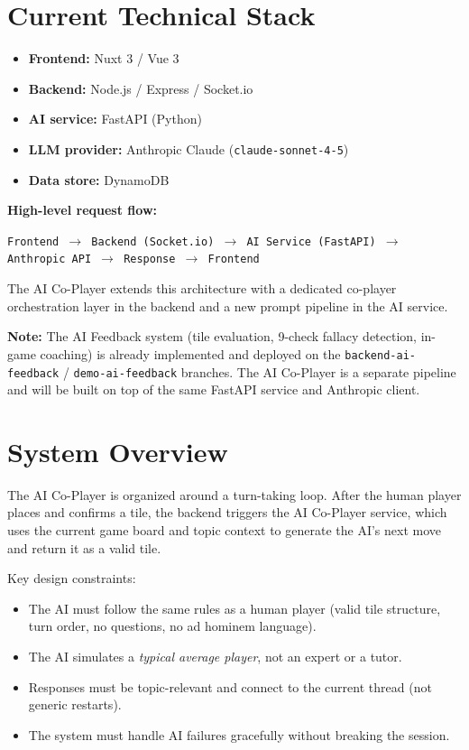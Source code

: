 \documentclass[11pt]{article}
\begin{document}
\section{Current Technical Stack}

\begin{itemize}
  \item \textbf{Frontend:} Nuxt 3 / Vue 3
  \item \textbf{Backend:} Node.js / Express / Socket.io
  \item \textbf{AI service:} FastAPI (Python)
  \item \textbf{LLM provider:} Anthropic Claude (\texttt{claude-sonnet-4-5})
  \item \textbf{Data store:} DynamoDB
\end{itemize}

\textbf{High-level request flow:}

\begin{center}
  \texttt{Frontend \(\rightarrow\) Backend (Socket.io) \(\rightarrow\) AI Service (FastAPI) \(\rightarrow\) Anthropic API \(\rightarrow\) Response \(\rightarrow\) Frontend}
\end{center}

The AI Co-Player extends this architecture with a dedicated co-player orchestration layer in the
backend and a new prompt pipeline in the AI service.

\textbf{Note:} The AI Feedback system (tile evaluation, 9-check fallacy detection, in-game
coaching) is already implemented and deployed on the \texttt{backend-ai-feedback} /
\texttt{demo-ai-feedback} branches. The AI Co-Player is a separate pipeline and will be built
on top of the same FastAPI service and Anthropic client.

\section{System Overview}

The AI Co-Player is organized around a turn-taking loop. After the human player places and
confirms a tile, the backend triggers the AI Co-Player service, which uses the current game
board and topic context to generate the AI's next move and return it as a valid tile.

Key design constraints:
\begin{itemize}
  \item The AI must follow the same rules as a human player (valid tile structure, turn order,
        no questions, no ad hominem language).
  \item The AI simulates a \textit{typical average player}, not an expert or a tutor.
  \item Responses must be topic-relevant and connect to the current thread (not generic restarts).
  \item The system must handle AI failures gracefully without breaking the session.
\end{itemize}
\end{document}
